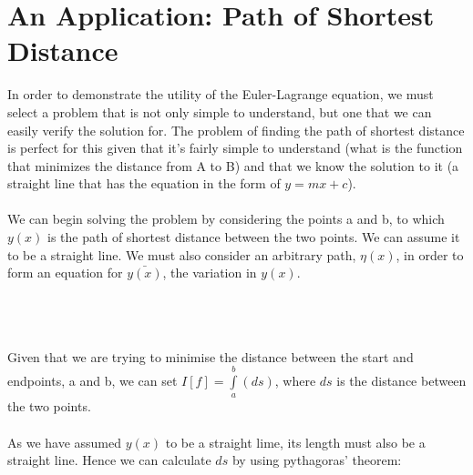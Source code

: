 \documentclass[12pt]{report}
\begin{document}
\section{An Application: Path of Shortest Distance}
In order to demonstrate the utility of the Euler-Lagrange equation, we must select a problem that is not only simple to understand, but one that we can easily verify the solution for. The problem of finding the path of shortest distance is perfect for this given that it's fairly simple to understand (what is the function that minimizes the distance from A to B) and that we know the solution to it (a straight line that has the equation in the form of \(y=mx+c\)).
\\
\\
We can begin solving the problem by considering the points a and b, to which \(y(x)\) is the path of shortest distance between the two points. We can assume it to be a straight line. We must also consider an arbitrary path, \(\eta (x)\), in order to form an equation for \(\bar{y(x)}\), the variation in \(y(x)\).
\\
\\
\\
\\
Given that we are trying to minimise the distance between the start and endpoints, a and b, we can set \(I[f] = \int\limits_a^b (ds)\), where \(ds\) is the distance between the two points.
\\
\\
As we have assumed \(y(x)\) to be a straight lime, its length must also be a straight line. Hence we can calculate \(ds\) by using pythagoras' theorem:
\\
\\
\end{document}
